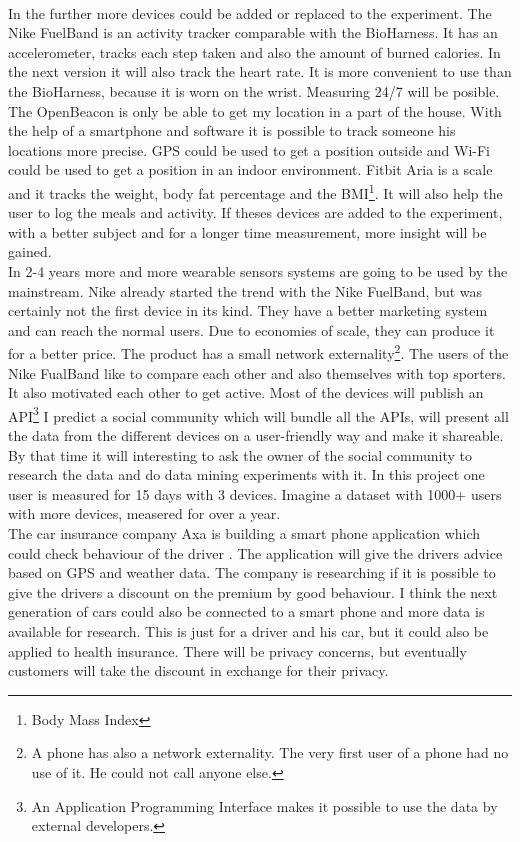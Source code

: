 	\\
	In the further more devices could be added or replaced to the experiment. The Nike FuelBand\cite{fuelband} is an activity tracker comparable with the BioHarness. It has an accelerometer, tracks each step taken and also the amount of burned calories. In the next version it will also track the heart rate\cite{fuelband2}. It is more convenient to use than the BioHarness, because it is worn on the wrist. Measuring 24/7 will be posible. The OpenBeacon is only be able to get my location in a part of the house. With the help of a smartphone and software it is possible to track someone his locations more precise. GPS could be used to get a position outside and Wi-Fi could be used to get a position in an indoor environment\cite{Howard-2003-283}. Fitbit Aria\cite{aria} is a scale and it tracks the weight, body fat percentage and the BMI\footnote{Body Mass Index}. It will also help the user to log the meals and activity. If theses devices are added to the experiment, with a better subject and for a longer time measurement, more insight will be gained.
	\\
	In 2-4 years more and more wearable sensors systems are going to be used by the mainstream. Nike already started the trend with the Nike FuelBand, but was certainly not the first device in its kind. They have a better marketing system and can reach the normal users. Due to economies of scale, they can produce it for a better price. The product has a small network externality\footnote{A phone has also a network externality. The very first user of a phone had no use of it. He could not call anyone else.}. The users of the Nike FualBand like to compare each other and also themselves with top sporters. It also motivated each other to get active. Most of the devices will publish an API\footnote{An Application Programming Interface makes it possible to use the data by external developers.} I predict a social community which will bundle all the APIs, will present all the data from the different devices on a user-friendly way and make it shareable. By that time it will interesting to ask the owner of the social community to research the data and do data mining experiments with it. In this project one user is measured for 15 days with 3 devices. Imagine a dataset with 1000+ users with more devices, measered for over a year.
	\\	
	The car insurance company Axa is building a smart phone application which could check behaviour of the driver \cite{axa}. The application will give the drivers advice based on GPS and weather data. The company is researching if it is possible to give the drivers a discount on the premium by good behaviour. I think the next generation of cars could also be connected to a smart phone and more data is available for research. This is just for a driver and his car, but it could also be applied to health insurance. There will be privacy concerns, but eventually customers will take the discount in exchange for their privacy. 
